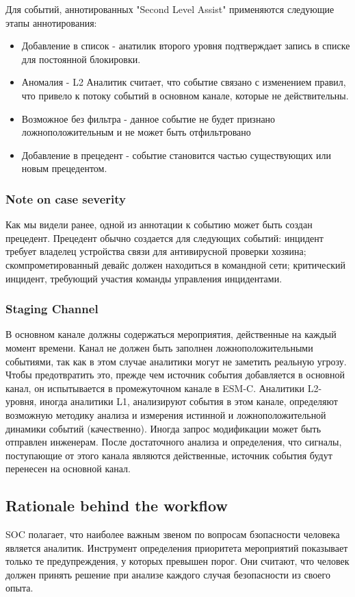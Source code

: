 \documentclass[12pt,]{article}
\begin{document}
Для событий, аннотированных "Second Level Assist" применяются следующие этапы аннотирования:
\begin{itemize}
  \item Добавление в список - анатилик второго уровня подтверждает запись в списке для постоянной блокировки.
  \item Аномалия - L2 Аналитик считает, что событие связано с изменением правил, что привело к потоку событий в основном канале, которые не действительны.
  \item Возможное без фильтра - данное событие не будет признано ложноположительным и не может быть отфильтровано
  \item Добавление в прецедент - событие становится частью существующих или новым прецедентом.
\end{itemize}
\subsubsection{Note on case severity}
Как мы видели ранее, одной из аннотации к событию может быть создан прецедент. Прецедент обычно создается для следующих событий: инцидент требует владелец устройства связи для антивирусной проверки хозяина; скомпрометированный девайс должен находиться в командной сети; критический инцидент, требующий участия команды управления инцидентами.
\subsubsection{Staging Channel}
В основном канале должны содержаться мероприятия, действенные на каждый момент времени. Канал не должен быть заполнен ложноположительными событиями, так как в этом случае аналитики могут не заметить реальную угрозу. Чтобы предотвратить это, прежде чем источник события добавляется в основной канал, он испытывается в промежуточном канале в ESM-C. Аналитики L2-уровня, иногда аналитики L1, анализируют события в этом канале, определяют возможную методику анализа и измерения истинной и ложноположительной динамики событий (качественно). Иногда запрос модификации может быть отправлен инженерам. После достаточного анализа и определения, что сигналы, поступающие от этого канала являются действенные, источник события будут перенесен на основной канал.
\subsection{Rationale behind the workflow}
SOC полагает, что наиболее важным звеном по вопросам бзопасности человека является аналитик.  Инструмент определения приоритета мероприятий показывает только те предупреждения, у которых превышен порог. Они считают, что человек должен принять решение при анализе каждого случая безопасности из своего опыта.
\end{document}

